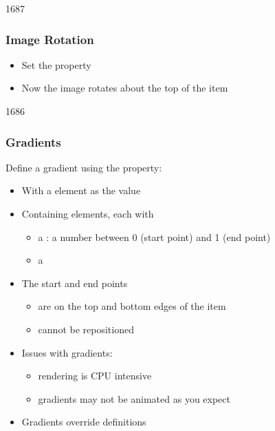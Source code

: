 
\begin{slide}{1687}\frametitle{Image Rotation}


\begin{itemize}
\item Set the  property
\item Now the image rotates about the top of the item
\end{itemize}

\end{slide}


\begin{slide}{1686}\frametitle{Gradients}

Define a gradient using the  property:

\begin{itemize}
\item With a  element as the value
\item Containing  elements, each with
  \begin{itemize}
  \item a : a number between 0 (start point) and 1 (end point)
  \item a 
  \end{itemize}
\item The start and end points
  \begin{itemize}
    \item are on the top and bottom edges of the item
    \item cannot be repositioned
  \end{itemize}
\item Issues with gradients:
  \begin{itemize}
  \item rendering is CPU intensive
  \item gradients may not be animated as you expect
  \end{itemize}
\item Gradients override  definitions
\end{itemize}

\end{slide}

